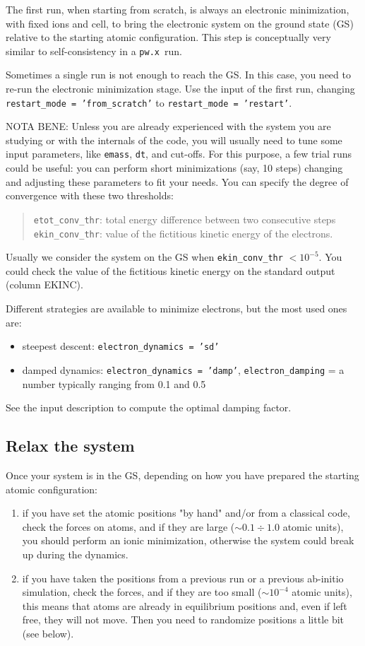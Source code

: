 \documentclass[12pt,a4paper]{article}
\def\pwx{\texttt{pw.x}}
\begin{document}
The first run, when starting from scratch, is always an electronic 
minimization, with fixed ions and cell, to bring the electronic system on the ground state (GS) relative to the starting atomic configuration. This step is conceptually very similar to
self-consistency in a \pwx\ run.

Sometimes a single run is not enough to reach the GS. In this case,
you need to re-run the electronic minimization stage. Use the input 
of the first run, changing \texttt{restart\_mode = 'from\_scratch'}
to \texttt{restart\_mode = 'restart'}.
   
NOTA BENE: Unless you are already experienced with the system 
you are studying or with the internals of the code, you will usually need 
to tune some input parameters, like \texttt{emass}, \texttt{dt}, and cut-offs. For this 
purpose, a few trial runs could be useful: you can perform short
minimizations (say, 10 steps) changing and adjusting these parameters 
to fit your needs. You can specify the degree of convergence with these
two thresholds:
\begin{quote}
\texttt{etot\_conv\_thr}: total energy difference between two consecutive steps\\
\texttt{ekin\_conv\_thr}: value of the fictitious kinetic energy of the electrons.
\end{quote}
   
Usually we consider the system on the GS when 
\texttt{ekin\_conv\_thr} $ < 10^{-5}$.
You could check the value of the fictitious kinetic energy on the standard 
output (column EKINC).

Different strategies are available to minimize electrons, but the most used 
ones are:
\begin{itemize}
\item steepest descent: \texttt{electron\_dynamics = 'sd'}
\item damped dynamics: \texttt{electron\_dynamics = 'damp'},
\texttt{electron\_damping} = a number typically ranging from 0.1 and 0.5 
\end{itemize}
See the input description to compute the optimal damping factor.

\subsection{Relax the system}

Once your system is in the GS, depending on how you have prepared the starting
atomic configuration:
\begin{enumerate}
\item
if you have set the atomic positions "by hand" and/or from a classical code, 
check the forces on atoms, and if they are large ($\sim 0.1 \div 1.0$
atomic units), you should perform an ionic minimization, otherwise the
system could break up during the dynamics.
\item
if you have taken the positions from a previous run or a previous ab-initio 
simulation, check the forces, and if they are too small ($\sim 10^{-4}$ 
atomic units), this means that atoms are already in equilibrium positions 
and, even if left free, they will not move. Then you need to randomize 
positions a little bit (see below).
\end{enumerate}
\end{document}
